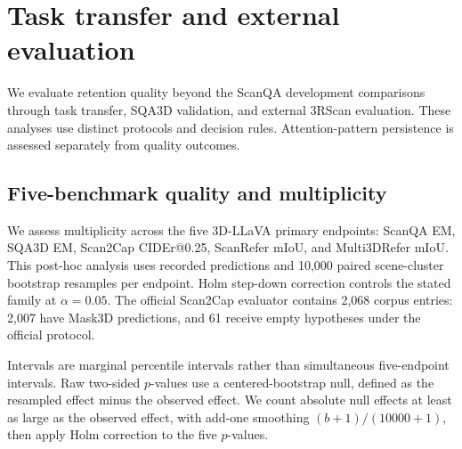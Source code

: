 \section{Task transfer and external evaluation}
\label{sec:supp_transfer}
We evaluate retention quality beyond the ScanQA development comparisons through task transfer, SQA3D validation, and external 3RScan evaluation. These analyses use distinct protocols and decision rules. Attention-pattern persistence is assessed separately from quality outcomes.


\subsection{Five-benchmark quality and multiplicity}
\label{sec:supp_multiplicity}

We assess multiplicity across the five 3D-LLaVA primary endpoints: ScanQA EM, SQA3D EM, Scan2Cap CIDEr@0.25, ScanRefer mIoU, and Multi3DRefer mIoU. This post-hoc analysis uses recorded predictions and 10,000 paired scene-cluster bootstrap resamples per endpoint. Holm step-down correction controls the stated family at $\alpha=0.05$. The official Scan2Cap evaluator contains 2,068 corpus entries: 2,007 have Mask3D predictions, and 61 receive empty hypotheses under the official protocol.

Intervals are marginal percentile intervals rather than simultaneous five-endpoint intervals. Raw two-sided $p$-values use a centered-bootstrap null, defined as the resampled effect minus the observed effect. We count absolute null effects at least as large as the observed effect, with add-one smoothing $(b+1)/(10000+1)$, then apply Holm correction to the five $p$-values.

\begin{table}[t]
\centering
\caption{Family-wise sensitivity across the five 3D-LLaVA primary endpoints. Deltas are GeoGate minus baseline: EM in percentage points, mIoU in 0--100-scale points, and CIDEr in score points. Intervals are marginal paired scene-cluster percentile 95\% intervals; Holm $p$-values address the five-endpoint family.}
\label{tab:supp_multiplicity}
\end{table}

